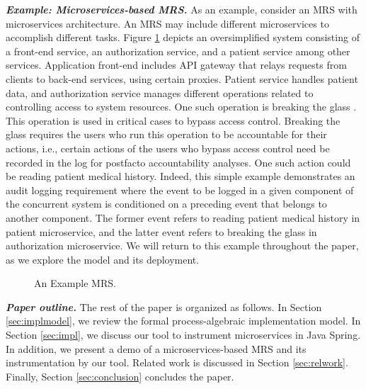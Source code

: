 \textbf{\textit{Example: Microservices-based MRS.}}
As an example, consider an MRS with microservices architecture. An MRS may include different microservices to accomplish different tasks. Figure \ref{fig:mrs-mics} depicts an oversimplified system consisting of a front-end service, an authorization service, and a patient service among other services. Application front-end includes API gateway that relays requests from clients to back-end services, using certain proxies. Patient service handles patient data, and authorization service manages different operations related to controlling access to system resources. One such operation is breaking the glass \cite{matthews-gaebel-hie09}. This operation is used in critical cases to bypass access control. Breaking the glass requires the users who run this operation to be accountable for their actions, i.e., certain actions of the users who bypass access control need be recorded in the log for postfacto accountability analyses. One such action could be reading patient medical history. Indeed, this simple example demonstrates an audit logging requirement where the event to be logged in a given component of the concurrent system is conditioned on a preceding event that belongs to another component. The former event refers to reading patient medical history in patient microservice, and the latter event refers to breaking the glass in authorization microservice. We will return to this example throughout the paper, as we explore the model and its deployment.


\begin{figure} 
	\centering
	\caption{An Example MRS.}
	\label{fig:mrs-mics}
\end{figure}


\textbf{\textit{Paper outline.}}
The rest of the paper is organized as follows. In Section \ref{sec:implmodel}, we review the formal process-algebraic implementation model. In Section \ref{sec:impl}, we discuss our tool to instrument microservices in Java Spring. In addition, we present a demo of a microservices-based MRS and its instrumentation by our tool. 
Related work is discussed in Section \ref{sec:relwork}. Finally, Section \ref{sec:conclusion} concludes the paper.

